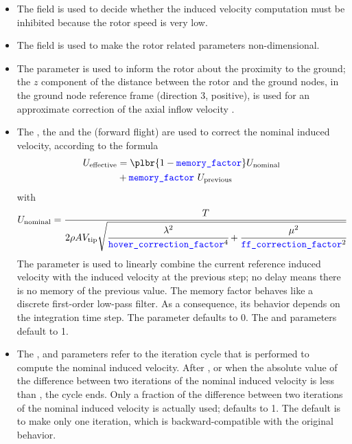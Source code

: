 \begin{itemize}
\item
The  field is used to decide whether
the induced velocity computation must be inhibited because the rotor speed
is very low.

\item
The  field is used to make the rotor related parameters
non-dimensional.

\item
The  parameter is used to inform the rotor about the proximity
to the ground; the $z$ component of the distance between the rotor
and the ground nodes, in the ground node reference frame
(direction 3, positive),
is used for an approximate correction of the axial inflow velocity
\cite{NASA-TR-3021}.

\item
The , the 
and the  (forward flight) are
used to correct the nominal induced velocity, according to the formula
\begin{align*}
	U_{\text{effective}}
	&=
	\plbr{1 - \nt{memory\_factor}} U_{\text{nominal}}
	\\
	&+ \nt{memory\_factor} \ U_{\text{previous}}
\end{align*}
with
\begin{align*}
	U_{\text{nominal}}
	&=
	\frac{T}{2 \rho A V_{\text{tip}} \sqrt{
		\cfrac{\lambda^2}{\textcolor{blue}{\texttt{hover\_correction\_factor}}^4}
		+ \cfrac{\mu^2}{\textcolor{blue}{\texttt{ff\_correction\_factor}}^2}
	}}
\end{align*}
The  parameter is used to linearly combine the current
reference induced velocity with the induced velocity at the previous step;
no delay means there is no memory of the previous value.
The memory factor behaves like a discrete first-order low-pass filter.
As a consequence, its behavior depends on the integration time step.
The  parameter defaults to 0.
The 
and  parameters default to 1.

\item
The , 
and  parameters refer to the iteration cycle
that is performed to compute the nominal induced velocity.
After , or when the absolute value
of the difference between two iterations of the nominal induced
velocity is less than , the cycle ends.
Only a fraction  of the difference between two
iterations of the nominal induced velocity is actually
used;  defaults to 1.
The default is to make only one iteration, which is backward-compatible
with the original behavior.
\end{itemize}

